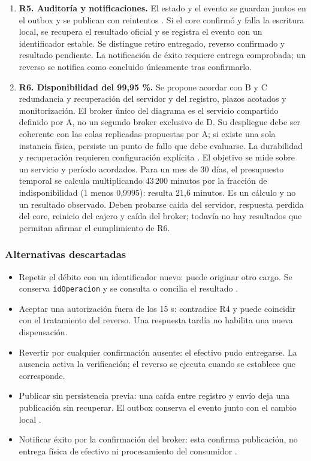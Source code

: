 \documentclass[12pt,a4paper]{article}
\begin{document}
\begin{enumerate}
    \item \textbf{R5. Auditoría y notificaciones.}
    El estado y el evento se guardan juntos en el outbox y se publican con reintentos \cite{awsoutbox}. Si el core confirmó y falla la escritura local, se recupera el resultado oficial y se registra el evento con un identificador estable. Se distingue retiro entregado, reverso confirmado y resultado pendiente. La notificación de éxito requiere entrega comprobada; un reverso se notifica como concluido únicamente tras confirmarlo.

    \item \textbf{R6. Disponibilidad del 99,95 \%.}
    Se propone acordar con B y C redundancia y recuperación del servidor y del registro, plazos acotados y monitorización. El broker único del diagrama es el servicio compartido definido por A, no un segundo broker exclusivo de D. Su despliegue debe ser coherente con las colas replicadas propuestas por A; si existe una sola instancia física, persiste un punto de fallo que debe evaluarse. La durabilidad y recuperación requieren configuración explícita \cite{rabbitmqreliability,rabbitmqquorum}.
    El objetivo se mide sobre un servicio y período acordados. Para un mes de 30 días, el presupuesto temporal se calcula multiplicando 43\,200 minutos por la fracción de indisponibilidad (1 menos 0,9995): resulta 21,6 minutos. Es un cálculo y no un resultado observado. Deben probarse caída del servidor, respuesta perdida del core, reinicio del cajero y caída del broker; todavía no hay resultados que permitan afirmar el cumplimiento de R6.
\end{enumerate}

\subsubsection{Alternativas descartadas}

\begin{itemize}
    \item Repetir el débito con un identificador nuevo: puede originar otro cargo. Se conserva \texttt{idOperacion} y se consulta o concilia el resultado \cite{featonbyretries}.
    \item Aceptar una autorización fuera de los 15 s: contradice R4 y puede coincidir con el tratamiento del reverso. Una respuesta tardía no habilita una nueva dispensación.
    \item Revertir por cualquier confirmación ausente: el efectivo pudo entregarse. La ausencia activa la verificación; el reverso se ejecuta cuando se establece que corresponde.
    \item Publicar sin persistencia previa: una caída entre registro y envío deja una publicación sin recuperar. El outbox conserva el evento junto con el cambio local \cite{awsoutbox}.
    \item Notificar éxito por la confirmación del broker: esta confirma publicación, no entrega física de efectivo ni procesamiento del consumidor \cite{rabbitmqconfirms}.
\end{itemize}
\end{document}
